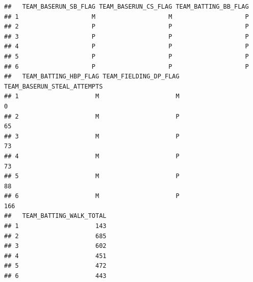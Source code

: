 \documentclass[
]{article}
\begin{document}
\begin{verbatim}
##   TEAM_BASERUN_SB_FLAG TEAM_BASERUN_CS_FLAG TEAM_BATTING_BB_FLAG
## 1                    M                    M                    P
## 2                    P                    P                    P
## 3                    P                    P                    P
## 4                    P                    P                    P
## 5                    P                    P                    P
## 6                    P                    P                    P
##   TEAM_BATTING_HBP_FLAG TEAM_FIELDING_DP_FLAG TEAM_BASERUN_STEAL_ATTEMPTS
## 1                     M                     M                           0
## 2                     M                     P                          65
## 3                     M                     P                          73
## 4                     M                     P                          73
## 5                     M                     P                          88
## 6                     M                     P                         166
##   TEAM_BATTING_WALK_TOTAL
## 1                     143
## 2                     685
## 3                     602
## 4                     451
## 5                     472
## 6                     443
\end{verbatim}
\end{document}
